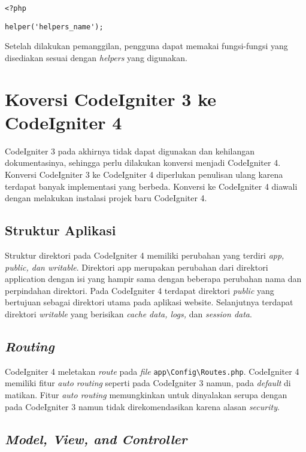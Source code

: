 \begin{center}
\verb|<?php|

\verb|helper('helpers_name');|
\end{center}
Setelah dilakukan pemanggilan, pengguna dapat memakai fungsi-fungsi yang disediakan sesuai dengan \textit{helpers} yang digunakan.

\section{Koversi CodeIgniter 3 ke CodeIgniter 4\cite{codeigniter:23:ci4}}
\label{sec:konversici3c4}
 
CodeIgniter 3 pada akhirnya tidak dapat digunakan dan kehilangan dokumentasinya, sehingga perlu dilakukan konversi menjadi CodeIgniter 4. Konversi CodeIgniter 3 ke CodeIgniter 4 diperlukan penulisan ulang karena terdapat banyak implementasi yang berbeda. Konversi ke CodeIgniter 4 diawali dengan melakukan instalasi projek baru CodeIgniter 4.


\subsection{Struktur Aplikasi}

Struktur direktori pada CodeIgniter 4 memiliki perubahan yang terdiri \textit{app, public, dan writable}. Direktori app merupakan perubahan dari direktori application dengan isi yang hampir sama dengan beberapa perubahan nama dan perpindahan direktori. Pada CodeIgniter 4 terdapat direktori \textit{public} yang bertujuan sebagai direktori utama pada aplikasi website. Selanjutnya terdapat direktori \textit{writable} yang berisikan \textit{cache data, logs,} dan \textit{session data}.

\subsection{\textit{Routing}}

CodeIgniter 4 meletakan \textit{route} pada \textit{file} \verb|app\Config\Routes.php|. CodeIgniter 4 memiliki fitur \textit{auto routing} seperti pada CodeIgniter 3 namun, pada \textit{default} di matikan. Fitur \textit{auto routing} memungkinkan untuk dinyalakan serupa dengan pada CodeIgniter 3 namun tidak direkomendasikan karena alasan \textit{security}.
 
\subsection{\textit{Model, View, and Controller}}
 
